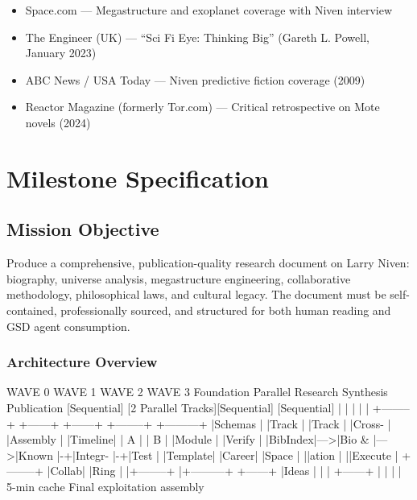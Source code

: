 \documentclass[11pt,letterpaper]{article}
\newcommand{\stageheader}[2]{%
  \noindent\colorbox{#2}{\makebox[\textwidth][l]{%
    \textcolor{white}{\bfseries\sffamily\hspace{6pt}#1\hspace{6pt}}}}%
  \vspace{0.5em}\par%
}
\begin{document}
\begin{itemize}[leftmargin=2em]
\item Space.com --- Megastructure and exoplanet coverage with Niven interview
\item The Engineer (UK) --- ``Sci Fi Eye: Thinking Big'' (Gareth L. Powell, January 2023)
\item ABC News / USA Today --- Niven predictive fiction coverage (2009)
\item Reactor Magazine (formerly Tor.com) --- Critical retrospective on Mote novels (2024)
\end{itemize}

\newpage

\stageheader{STAGE 3 --- MISSION PACKAGE}{tertiary}

\section{Milestone Specification}

\subsection{Mission Objective}

Produce a comprehensive, publication-quality research document on Larry Niven: biography, universe analysis, megastructure engineering, collaborative methodology, philosophical laws, and cultural legacy. The document must be self-contained, professionally sourced, and structured for both human reading and GSD agent consumption.

\subsubsection{Architecture Overview}

\begin{asciibox}
  WAVE 0          WAVE 1             WAVE 2        WAVE 3
  Foundation      Parallel Research  Synthesis      Publication
  [Sequential]    [2 Parallel Tracks][Sequential]   [Sequential]
       |               |    |             |              |
  +--------+    +------+    +------+  +--------+  +---------+
  |Schemas |    |Track |    |Track |  |Cross-  |  |Assembly |
  |Timeline|    |  A   |    |  B   |  |Module  |  |Verify   |
  |BibIndex|--->|Bio & |--->|Known |-+|Integr- |-+|Test     |
  |Template|    |Career|    |Space | ||ation   | ||Execute  |
  +--------+    |Collab|    |Ring  | |+--------+ |+---------+
                +------+    |Ideas | |           |
                            +------+ |           |
                                     |           |
                               5-min cache    Final
                               exploitation  assembly
\end{asciibox}
\end{document}
